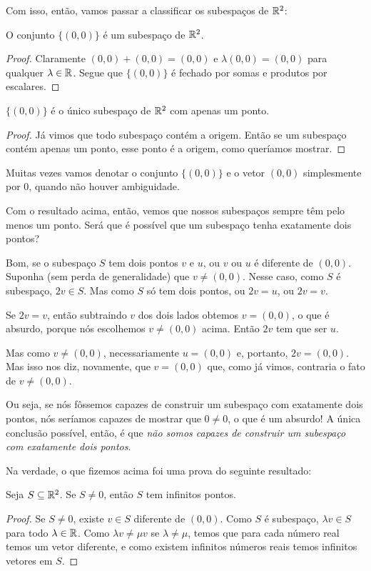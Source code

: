 Com isso, então, vamos passar a classificar os subespaços de $\mathbb R^2$:

\begin{prop}
	O conjunto $\{(0,0)\}$ é um subespaço de $\mathbb R^2$.
\end{prop}
\begin{proof}
	Claramente $(0,0)+(0,0)=(0,0)$ e $\lambda(0,0)=(0,0)$ para qualquer $\lambda\in \mathbb R$. Segue que $\{(0,0)\}$ é fechado por somas e produtos por escalares.
\end{proof}
\begin{cor}
	$\{(0,0)\}$ é o único subespaço de $\mathbb R^2$ com apenas um ponto.
\end{cor}
\begin{proof}
	Já vimos que todo subespaço contém a origem. Então se um subespaço contém apenas um ponto, esse ponto é a origem, como queríamos mostrar.
\end{proof}

\begin{rmk}
	Muitas vezes vamos denotar o conjunto $\{(0,0)\}$ e o vetor $(0,0)$ simplesmente por $0$, quando não houver ambiguidade.
\end{rmk}

\begin{ex}
	Com o resultado acima, então, vemos que nossos subespaços sempre têm pelo menos um ponto. Será que é possível que um subespaço tenha exatamente dois pontos?
	
	Bom, se o subespaço $S$ tem dois pontos $v$ e $u$, ou $v$ ou $u$ é diferente de $(0,0)$. Suponha (sem perda de generalidade) que $v\neq(0,0)$. Nesse caso, como $S$ é subespaço, $2v\in S$. Mas como $S$ só tem dois pontos, ou $2v=u$, ou $2v=v$.
	
	Se $2v=v$, então subtraindo $v$ dos dois lados obtemos $v=(0,0)$, o que é absurdo, porque nós escolhemos $v\neq(0,0)$ acima. Então $2v$ tem que ser $u$.
	
	Mas como $v\neq(0,0)$, necessariamente $u=(0,0)$ e, portanto, $2v=(0,0)$. Mas isso nos diz, novamente, que $v=(0,0)$ que, como já vimos, contraria o fato de $v\neq(0,0)$.
	
	Ou seja, se nós fôssemos capazes
	 de construir um subespaço com exatamente dois pontos, nós seríamos capazes de mostrar que $0\neq 0$, o que é um absurdo! A única conclusão possível, então, é que \textit{não somos capazes de construir um subespaço com exatamente dois pontos}.
\end{ex}

Na verdade, o que fizemos acima foi uma prova do seguinte resultado:
\begin{prop}
	Seja $S\subseteq\mathbb R^2$. Se $S\neq 0$, então $S$ tem infinitos pontos.
\end{prop}
\begin{proof}
	Se $S\neq 0$, existe $v\in S$ diferente de $(0,0)$. Como $S$ é subespaço, $\lambda v\in S$ para todo $\lambda\in \mathbb R$. Como $\lambda v\neq \mu v$ se $\lambda\neq \mu$, temos que para cada número real temos um vetor diferente, e como existem infinitos números reais temos infinitos vetores em $S$.
\end{proof}

